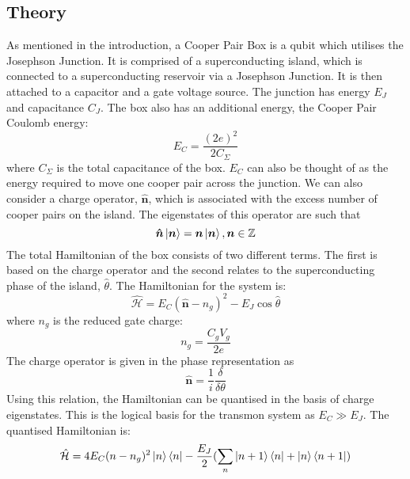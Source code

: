 \documentclass[11pt]{article}
\newcommand*{\hatH}{\hat{\mathcal{H}}}
\begin{document}
   \subsection{Theory}
   As mentioned in the introduction, a Cooper Pair Box is a qubit which utilises the Josephson Junction. It is comprised of a superconducting island, which is connected to a superconducting reservoir via a Josephson Junction. It is then attached to a capacitor and a gate voltage source. The junction has energy $E_J$ and capacitance $C_J$. The box also has an additional energy, the Cooper Pair Coulomb energy:
	\begin{equation} \label{eq:1}
	E_C =  \frac{(2e)^2}{2C_\Sigma}
	\end{equation}
	where $C_\Sigma$ is the total capacitance of the box. $E_C$ can also be thought of as the energy required to move one cooper pair across the junction. We can also consider a charge operator, $\boldsymbol{\hat{n}}$, which is associated with the excess number of cooper pairs on the island. The eigenstates of this operator are such that
	\begin{equation} \label{eq:2}
	\boldsymbol{\hat{n}}\ket{\boldsymbol{n}} = \boldsymbol{n}\ket{\boldsymbol{n}},  \boldsymbol{n} \in \mathbb{Z}
	\end{equation}
The total Hamiltonian of the box consists of two different terms. The first is based on the charge operator and the second relates to the superconducting phase of the island, $\hat{\theta}$. The Hamiltonian for the system is:
	\begin{equation} \label{eq:3}
	\hatH = E_C (\boldsymbol{\hat{n}} - n_g)^2 - E_J \cos{\hat{\theta}}
	\end{equation}
where $n_g$ is the reduced gate charge:
	\begin{equation} \label{eq:4}
	n_g = \frac{C_g V_g}{2e}
	\end{equation}
The charge operator is given in the phase representation as
	\begin{equation} \label{eq:5}
	\boldsymbol{\hat{n}} = \frac{1}{i} \frac{\delta}{\delta\theta}
	\end{equation}
Using this relation, the Hamiltonian can be quantised in the basis of charge eigenstates. This is the logical basis for the transmon system as $E_C \gg E_J$. The quantised Hamiltonian is:
	\begin{equation} \label{eq:6}
	\hatH = 4E_C (n-n_g)^2 \ket{n}\bra{n} - \frac{E_J}{2}(\sum_{n} \ket{n+1}\bra{n} + \ket{n}\bra{n+1})
	\end{equation}
\end{document}

